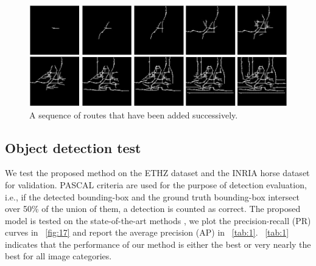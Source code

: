 \documentclass[journal]{IEEEtran}
\begin{document}
\begin{figure}[!t]
\centering
\includegraphics[width=0.8\linewidth]{images/fig20.jpg}
\caption{A sequence of routes that have been added successively.}
\label{fig:20}
\end{figure}

\subsection{Object detection test}

We test the proposed method on the ETHZ dataset and the INRIA horse dataset for validation.
PASCAL criteria are used for the purpose of detection evaluation, 
i.e., if the detected bounding-box and the ground truth bounding-box intersect over 50\%{} of the union of them, 
a detection is counted as correct.
The proposed model is tested on the state-of-the-art methods 
\cite{lu2009,felzenszwalb2007,maji2009,srinivasan2010,wang2012,lin2012},
we plot the precision-recall (PR) curves in \figurename~\ref{fig:17} 
and report the average precision (AP) in \tablename~\ref{tab:1}.
\tablename~\ref{tab:1} indicates that the performance of our method is either the best or very nearly the best for all image categories.
 
\end{document}
